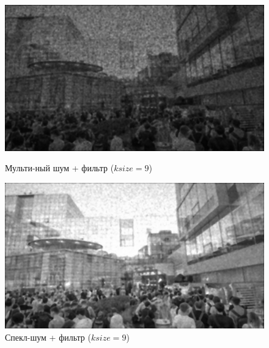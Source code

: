 \documentclass[a4paper]{article}
\begin{document}
\begin{figure}[H]
    \begin{minipage}{0.49\textwidth}
        \centering \includegraphics[width=\textwidth]{images/3_nonlinear_filters/multiplicative - 2d-median (ksize=9).jpg}
        \caption{Мульти-ный шум + фильтр ($ksize = 9$)}
    \end{minipage}\hfill
    \begin{minipage}{0.49\textwidth}
        \centering \includegraphics[width=\textwidth]{images/3_nonlinear_filters/speckle - 2d-median (ksize=9).jpg}
        \caption{Спекл-шум + фильтр ($ksize = 9$)}
    \end{minipage}
\end{figure}
\end{document}
